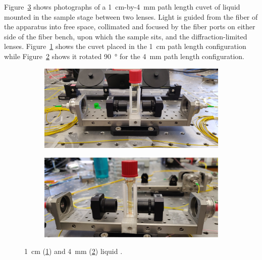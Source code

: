 Figure~\ref{fig:Raman:CS2Cuvetpics} shows photographs of a \SI{1}{\centi\meter}-by-\SI{4}{\milli\meter} path length cuvet of liquid  mounted in the sample stage between two lenses. Light is guided from the fiber of the apparatus into free space, collimated and focused by the fiber ports on either side of the fiber bench, upon which the sample sits, and the diffraction-limited lenses. Figure~\ref{fig:Raman:1cmCS2pic} shows the cuvet placed in the \SI{1}{\centi\meter} path length configuration while Figure~\ref{fig:Raman:4mmCS2pic} shows it rotated \SI{90}{\degree} for the \SI{4}{\milli\meter} path length configuration.

\begin{figure}[t]
    \centering
    \begin{subfigure}[b]{0.49\textwidth}
        \centering
        \includegraphics[width=\textwidth]{figs/4-Raman/1cmCS2.jpeg}
        \caption{}
        \label{fig:Raman:1cmCS2pic}
    \end{subfigure}
    \hfill
    \begin{subfigure}[b]{0.49\textwidth}
        \centering
        \includegraphics[width=\textwidth]{figs/4-Raman/4mmCS2.jpg}
        \caption{}
        \label{fig:Raman:4mmCS2pic}
    \end{subfigure}
    \caption{\SI{1}{\centi\meter} (\ref{fig:Raman:1cmCS2pic}) and \SI{4}{\milli\meter} (\ref{fig:Raman:4mmCS2pic}) liquid .}
    \label{fig:Raman:CS2Cuvetpics}
\end{figure}

